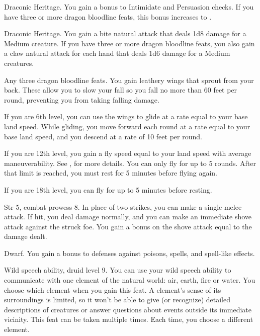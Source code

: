 \featpre Draconic Heritage.
\featben You gain a  bonus to Intimidate and Persuasion checks.
If you have three or more dragon bloodline feats, this bonus increases to .

\featpre Draconic Heritage.
\featben You gain a bite natural attack that deals 1d8 damage for a Medium creature.
If you have three or more dragon bloodline feats, you also gain a claw natural attack for each hand that deals 1d6 damage for a Medium creatures.

\featpre Any three dragon bloodline feats.
\featben You gain leathery wings that sprout from your back.
These allow you to slow your fall so you fall no more than 60 feet per round, preventing you from taking falling damage.

If you are 6th level, you can use the wings to glide at a rate equal to your base land speed.
While gliding, you move forward each round at a rate equal to your base land speed, and you descend at a rate of 10 feet per round.

If you are 12th level, you gain a fly speed equal to your land speed with average maneuverability.
See , for more details.
You can only fly for up to 5 rounds.
After that limit is reached, you must rest for 5 minutes before flying again.

If you are 18th level, you can fly for up to 5 minutes before resting.

\featpres Str 5, combat prowess 8.
\featben In place of two strikes, you can make a single melee attack.
If hit, you deal damage normally, and you can make an immediate shove attack against the struck foe.
You gain a bonus on the shove attack equal to the damage dealt.

\featpre Dwarf.
\featben You gain a  bonus to defenses against poisons, spells, and spell-like effects.

\featpres Wild speech ability, druid level 9.
\featben You can use your wild speech ability to communicate with one element of the natural world: air, earth, fire or water.
You choose which element when you gain this feat.
A element's sense of its surroundings is limited, so it won't be able to give (or recognize) detailed descriptions of creatures or answer questions about events outside its immediate vicinity.
 This feat can be taken multiple times.
Each time, you choose a different element.

